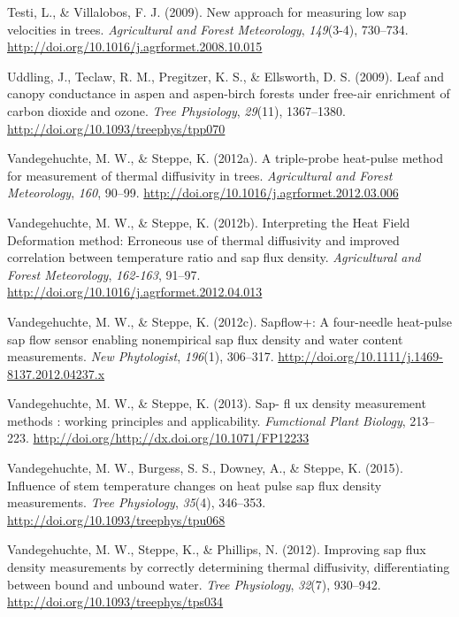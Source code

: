 \documentclass[11pt,twoside]{reedthesis}
\begin{document}
\hypertarget{ref-Testi2009}{}
Testi, L., \& Villalobos, F. J. (2009). New approach for measuring low
sap velocities in trees. \emph{Agricultural and Forest Meteorology},
\emph{149}(3-4), 730--734.
\url{http://doi.org/10.1016/j.agrformet.2008.10.015}

\hypertarget{ref-Uddling2009}{}
Uddling, J., Teclaw, R. M., Pregitzer, K. S., \& Ellsworth, D. S.
(2009). Leaf and canopy conductance in aspen and aspen-birch forests
under free-air enrichment of carbon dioxide and ozone. \emph{Tree
Physiology}, \emph{29}(11), 1367--1380.
\url{http://doi.org/10.1093/treephys/tpp070}

\hypertarget{ref-Vandegehuchte2012}{}
Vandegehuchte, M. W., \& Steppe, K. (2012a). A triple-probe heat-pulse
method for measurement of thermal diffusivity in trees.
\emph{Agricultural and Forest Meteorology}, \emph{160}, 90--99.
\url{http://doi.org/10.1016/j.agrformet.2012.03.006}

\hypertarget{ref-Vandegehuchte2012a}{}
Vandegehuchte, M. W., \& Steppe, K. (2012b). Interpreting the Heat Field
Deformation method: Erroneous use of thermal diffusivity and improved
correlation between temperature ratio and sap flux density.
\emph{Agricultural and Forest Meteorology}, \emph{162-163}, 91--97.
\url{http://doi.org/10.1016/j.agrformet.2012.04.013}

\hypertarget{ref-Vandegehuchte2012c}{}
Vandegehuchte, M. W., \& Steppe, K. (2012c). Sapflow+: A four-needle
heat-pulse sap flow sensor enabling nonempirical sap flux density and
water content measurements. \emph{New Phytologist}, \emph{196}(1),
306--317. \url{http://doi.org/10.1111/j.1469-8137.2012.04237.x}

\hypertarget{ref-Vandegehuchte2013}{}
Vandegehuchte, M. W., \& Steppe, K. (2013). Sap- fl ux density
measurement methods : working principles and applicability.
\emph{Fumctional Plant Biology}, 213--223.
\url{http://doi.org/http://dx.doi.org/10.1071/FP12233}

\hypertarget{ref-Vandegehuchte2015}{}
Vandegehuchte, M. W., Burgess, S. S., Downey, A., \& Steppe, K. (2015).
Influence of stem temperature changes on heat pulse sap flux density
measurements. \emph{Tree Physiology}, \emph{35}(4), 346--353.
\url{http://doi.org/10.1093/treephys/tpu068}

\hypertarget{ref-Vandegehuchte2012b}{}
Vandegehuchte, M. W., Steppe, K., \& Phillips, N. (2012). Improving sap
flux density measurements by correctly determining thermal diffusivity,
differentiating between bound and unbound water. \emph{Tree Physiology},
\emph{32}(7), 930--942. \url{http://doi.org/10.1093/treephys/tps034}
\end{document}
